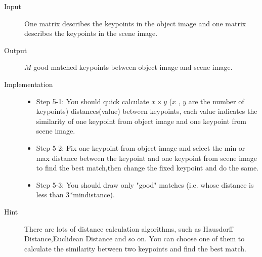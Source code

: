 \documentclass[12pt]{article}
\begin{document}
\begin{description}
\item[Input] One matrix describes the keypoints in the object image and one matrix describes the keypoints in the scene image.
\item[Output] $M$ good matched keypoints between object image and scene image.
\item[Implementation]
\begin{itemize}
\item Step 5-1: You should quick calculate $x \times y$ ($x$ , $y$ are the number of keypoints) distances(value) between keypoints, each value indicates the similarity of one keypoint from object image and one keypoint from scene image.
\item Step 5-2: Fix one keypoint from object image and select the min or max distance between the keypoint and one keypoint from scene image to find the best match,then change the fixed keypoint and do the same.
\item Step 5-3: You should draw only "good" matches (i.e. whose distance is less than 3*mindistance).
\end{itemize}   
\item[Hint] There are lots of distance calculation algorithms, such as Hausdorff Distance,Euclidean Distance and so on. You can choose one of them to calculate the similarity between two keypoints and find the best match.
\begin{figure}[!ht]
  \centering 
  \subfigure[]{ 
    \label{fig: result: b} %
}
\end{figure}
\end{description}
\end{document}
